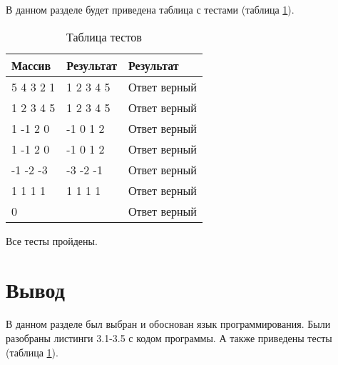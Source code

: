 В данном разделе будет приведена таблица с тестами (таблица \ref{table:ref1}).

\begin{table}[ht]
	\centering
	\caption{Таблица тестов}
	\label{table:ref1}
	\begin{tabular}{ | l | l | l |}
		\hline
		Массив    & Результат & Результат    \\ \hline
		5 4 3 2 1 & 1 2 3 4 5 & Ответ верный \\ \hline
		1 2 3 4 5 & 1 2 3 4 5 & Ответ верный \\ \hline
		1 -1 2 0  & -1 0 1 2  & Ответ верный \\ \hline
		1 -1 2 0  & -1 0 1 2  & Ответ верный \\ \hline
		-1 -2 -3  & -3 -2 -1  & Ответ верный \\ \hline
		1 1 1 1   & 1 1 1 1   & Ответ верный \\ \hline
		0         &           & Ответ верный \\ \hline
		\hline
	\end{tabular}
\end{table}

Все тесты пройдены.

\section{Вывод}

В данном разделе был выбран и обоснован язык программирования.
Были разобраны листинги 3.1-3.5 с кодом программы.
А также приведены тесты (таблица \ref{table:ref1}).